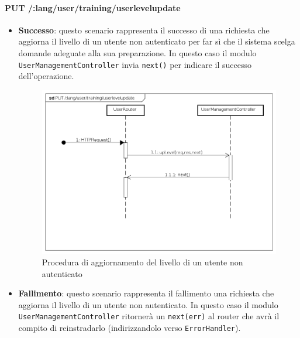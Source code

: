 \paragraph{PUT /:lang/user/training/userlevelupdate}
\begin{itemize}
\item \textbf{Successo}: questo scenario rappresenta il successo di una richiesta che aggiorna il livello di un utente non autenticato per far sì che il sistema scelga domande adeguate alla sua preparazione. In questo caso il modulo \texttt{UserManagementController} invia \texttt{next()} per indicare il successo dell'operazione.

\begin{figure}[ht]
	\centering
	\includegraphics[scale=0.45]{UML/DiagrammiDiSequenza/Back-end/PUT__lang_user_training_userlevelupdate_success.png}
	\caption{Procedura di aggiornamento del livello di un utente non autenticato}
\end{figure}
\FloatBarrier

\item \textbf{Fallimento}: questo scenario rappresenta il fallimento una richiesta che aggiorna il livello di un utente non autenticato. In questo caso il modulo \texttt{UserManagementController} ritornerà un \texttt{next(err)} al router che avrà il compito di reinstradarlo (indirizzandolo verso \texttt{ErrorHandler}).


\end{itemize}

